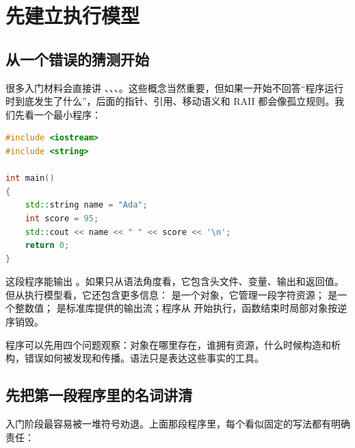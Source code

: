 \chapter{先建立执行模型}

\section{从一个错误的猜测开始}

很多入门材料会直接讲 、、、。这些概念当然重要，但如果一开始不回答“程序运行时到底发生了什么”，后面的指针、引用、移动语义和 RAII 都会像孤立规则。我们先看一个最小程序：

\begin{lstlisting}[language=C++,caption={一个看似普通的程序}]
#include <iostream>
#include <string>

int main()
{
    std::string name = "Ada";
    int score = 95;
    std::cout << name << " " << score << '\n';
    return 0;
}
\end{lstlisting}

这段程序能输出 。如果只从语法角度看，它包含头文件、变量、输出和返回值。但从执行模型看，它还包含更多信息： 是一个对象，它管理一段字符资源； 是一个整数值； 是标准库提供的输出流；程序从  开始执行，函数结束时局部对象按逆序销毁。

\begin{mentalmodel}
\cpp 程序可以先用四个问题观察：对象在哪里存在，谁拥有资源，什么时候构造和析构，错误如何被发现和传播。语法只是表达这些事实的工具。
\end{mentalmodel}

\section{先把第一段程序里的名词讲清}

入门阶段最容易被一堆符号劝退。上面那段程序里，每个看似固定的写法都有明确责任：

